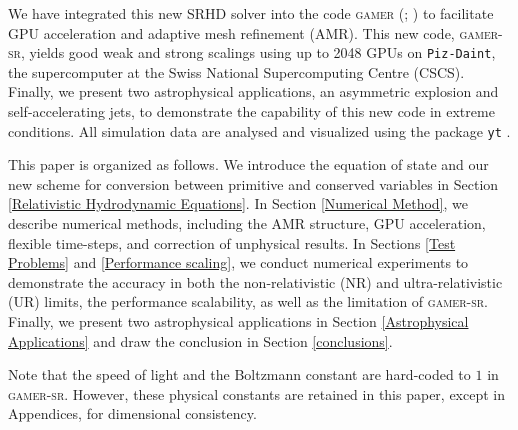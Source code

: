 We have integrated this new SRHD solver into the code \textsc{gamer}
(\citealt{gamer-1}; \citealt{gamer-2}) to facilitate GPU acceleration and adaptive mesh
refinement (AMR). This new code, \textsc{gamer-sr}, yields good weak and strong
scalings using up to 2048 GPUs on \texttt{Piz-Daint}, the supercomputer at the Swiss
National Supercomputing Centre (CSCS). Finally, we present two astrophysical applications,
an asymmetric explosion and self-accelerating jets, to demonstrate the capability of
this new code in extreme conditions. All simulation data are analysed and visualized
using the package \texttt{yt} \citep{YT}.

This paper is organized as follows. We introduce the equation of state and our new scheme
for conversion between primitive and conserved variables in Section
\ref{Relativistic Hydrodynamic Equations}. In Section \ref{Numerical Method}, we describe
numerical methods, including the AMR structure, GPU acceleration, flexible time-steps,
and correction of unphysical results. In Sections \ref{Test Problems} and
\ref{Performance scaling}, we conduct numerical experiments to demonstrate the accuracy in
both the non-relativistic (NR) and ultra-relativistic (UR) limits, the performance scalability,
as well as the limitation of \textsc{gamer-sr}. Finally, we present two astrophysical
applications in Section \ref{Astrophysical Applications} and draw the
conclusion in Section \ref{conclusions}.

Note that the speed of light and the Boltzmann constant are hard-coded to
$1$ in \textsc{gamer-sr}. However, these physical constants are retained in this paper,
except in Appendices, for dimensional consistency.
